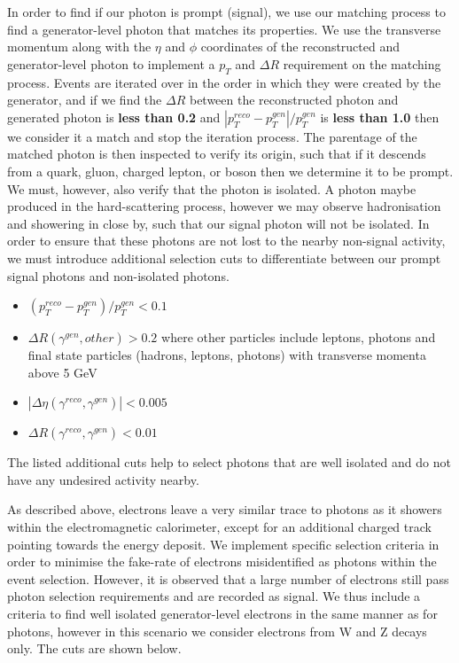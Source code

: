 In order to find if our photon is prompt (signal), we use our matching process to find a generator-level photon that matches its properties. We use the transverse momentum along with the $\eta$ and $\phi$ coordinates of the reconstructed and generator-level photon to implement a $p_T$ and $\Delta R$ requirement on the matching process. Events are iterated over in the order in which they were created by the generator, and if we find the $\Delta R$ between the reconstructed photon and generated photon is \textbf{less than 0.2} and $|p^{reco}_T - p^{gen}_T|/p^{gen}_T$ is \textbf{less than 1.0} then we consider it a match and stop the iteration process. The parentage of the matched photon is then inspected to verify its origin, such that if it descends from a quark, gluon, charged lepton, or boson then we determine it to be prompt. We must, however, also verify that the photon is isolated. A photon maybe produced in the hard-scattering process, however we may observe hadronisation and showering in close by, such that our signal photon will not be isolated. In order to ensure that these photons are not lost to the nearby non-signal activity, we must introduce additional selection cuts to differentiate between our prompt signal photons and non-isolated photons.  

\begin{itemize}
	\item $\left(p_T^{reco} - p_T^{gen}\right)/p_T^{gen} < 0.1$
	\item $\Delta R ( \gamma^{gen}, other ) > 0.2$ where other particles include leptons, photons and final state
particles (hadrons, leptons, photons) with transverse momenta above 5 GeV
	\item $|\Delta\eta ( \gamma^{reco}, \gamma^{gen} )| < 0.005$
	\item $\Delta R ( \gamma^{reco}, \gamma^{gen} ) < 0.01$
\end{itemize}

The listed additional cuts help to select photons that are well isolated and do not have any undesired activity nearby.

As described above, electrons leave a very similar trace to photons as it showers within the electromagnetic calorimeter, except for an additional charged track pointing towards the energy deposit. We implement specific selection criteria in order to minimise the fake-rate of electrons misidentified as photons within the event selection. However, it is observed that a large number of electrons still pass photon selection requirements and are recorded as signal. We thus include a criteria to find well isolated generator-level electrons in the same manner as for photons, however in this scenario we consider electrons from W and Z decays only. The cuts are shown below.

